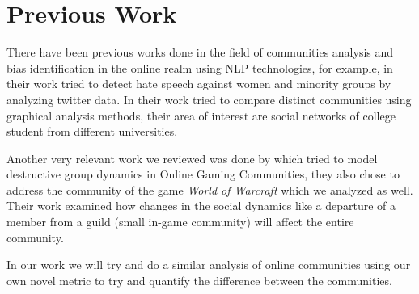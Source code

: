 \section{Previous Work}
There have been previous works done in the field of communities analysis and bias identification in the online realm using NLP technologies, for example, in their work \cite{wang2019ynu} tried to detect hate speech against women and minority groups by analyzing twitter data. In their work \cite{traud2011comparing} tried to compare distinct communities using graphical analysis methods, their area of interest are social networks of college student from different universities.

Another very relevant work we reviewed was done by \cite{patil2012modeling} which tried to model destructive group dynamics in Online Gaming Communities, they also chose to address the community of the game \emph{World of Warcraft} which we analyzed as well. Their work examined how changes in the social dynamics like a departure of a member from a guild (small in-game community) will affect the entire community.

In our work we will try and do a similar analysis of online communities using our own novel metric to try and quantify the difference between the communities.